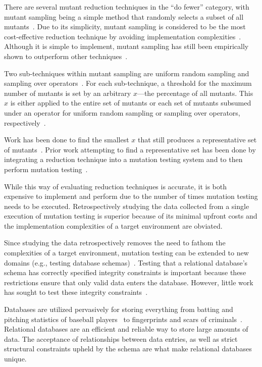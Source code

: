 
There are several mutant reduction techniques in the ``do fewer'' category, with mutant sampling being a simple method
that randomly selects a subset of all mutants~\cite{wong1995reducing}.  Due to its simplicity, mutant sampling is
considered to be the most cost-effective reduction technique by avoiding implementation
complexities~\cite{gopinath2015mutation}.  Although it is simple to implement, mutant sampling has still been
empirically shown to outperform other techniques~\cite{zhang2010operator}.

Two sub-techniques within mutant sampling are uniform random sampling and sampling over
operators~\cite{gopinath2015mutation, gopinath2015empirical}.  For each sub-technique, a threshold for the maximum
number of mutants is set by an arbitrary $x$---the percentage of all mutants.  This $x$ is either applied to the entire
set of mutants or each set of mutants subsumed under an operator for uniform random sampling or sampling over operators,
respectively~\cite{gopinath2015mutation, gopinath2015empirical}.

Work has been done to find the smallest $x$ that still produces
a representative set of mutants~\cite{jia2011analysis, mathur1994empirical}. Prior work
attempting to find a representative set has been done by integrating a reduction technique into
a mutation testing system and to then perform mutation testing~\cite{demillo1988extended, king1991fortran}.

While this way of evaluating reduction techniques is accurate, it is both
expensive to implement and perform due to the number of times mutation testing
needs to be executed. Retrospectively studying the data
collected from a single execution of mutation testing is superior
because of its minimal upfront costs and the implementation complexities of
a target environment are obviated.

Since studying the data retrospectively removes the need to fathom the complexities of a target environment,
mutation testing can be extended to new domains (e.g., testing database schemas)~\cite{mcminn2016virtual, mcminn2015effectiveness, wright2013efficient}.
Testing that a relational database's schema has correctly specified integrity constraints is important
because these restrictions ensure that only valid data enters the database. However, little work has
sought to test these integrity constraints~\cite{mcminn2016virtual}.

Databases are utilized pervasively for storing everything from batting and pitching statistics of baseball
players~\cite{lahmanbaseball} to fingerprints and scars of criminals~\cite{ngi}.
Relational databases are an efficient and reliable way to store large amounts of data.
The acceptance of relationships between data entries, as well as strict structural constraints
upheld by the schema are what make relational databases unique.

